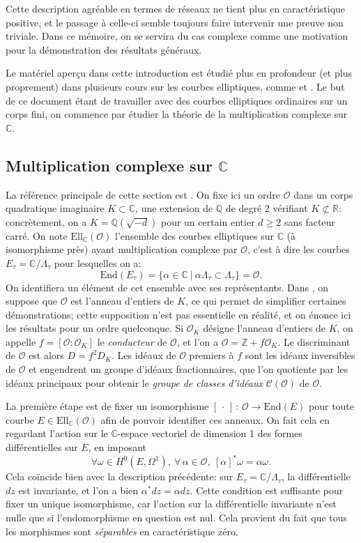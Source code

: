 \documentclass[11pt,a4paper]{article}
\newcommand{\Z}{\mathbb{Z}}
\newcommand{\C}{\mathbb{C}}
\newcommand{\Q}{\mathbb{Q}}
\newcommand{\R}{\mathbb{R}}
\renewcommand{\O}{\mathcal{O}}
\newcommand{\Cl}{\mathcal{C}}
\newcommand{\vers}{\longrightarrow}
\newcommand{\End}{\mathrm{End}}
\newcommand{\Ell}{\mathrm{Ell}}
\newcommand{\de}{\,:\,}
\renewcommand{\v}{\vspace{5mm}}
\theoremstyle{definition}
\begin{document}
Cette description agréable en termes de réseaux ne tient plus en caractéristique positive, et le passage à celle-ci semble toujours faire intervenir une preuve non triviale. Dans ce mémoire, on se servira du cas complexe comme une motivation pour la démonstration des résultats généraux.

\v

Le matériel aperçu dans cette introduction est étudié plus en profondeur (et plus proprement) dans plusieurs cours sur les courbes elliptiques, comme \cite{Nekovar} et \cite{Stroh}.
Le but de ce document étant de travailler avec des courbes elliptiques ordinaires sur un corps fini, on commence par étudier la théorie de la multiplication complexe sur $\C$.


\subsection{Multiplication complexe sur $\C$}


La référence principale de cette section est \cite{Sil2}. On fixe ici un ordre $\O$ dans un corps quadratique imaginaire $K\subset \C$, une extension de $\Q$ de degré 2 vérifiant $K \not\subset\R$: concrètement, on a $K=\Q(\sqrt{-d})$ pour un certain entier $d\geq 2$ sans facteur carré. On note $\Ell_\C(\O)$ l'ensemble des courbes elliptiques sur $\C$ (à isomorphisme près) ayant multiplication complexe par $\O$, c'est à dire les courbes $E_\tau = \C/\Lambda_\tau$ pour lesquelles on a:
$$\End(E_\tau) = \{\alpha\in \C\ |\ \alpha\Lambda_\tau \subset \Lambda_\tau\} = \O.$$
On identifiera un élément de cet ensemble avec ses représentants. Dans \cite{Sil2}, on suppose que $\O$ est l'anneau d'entiers de $K$, ce qui permet de simplifier certaines démonstrations; cette supposition n'est pas essentielle en réalité, et on énonce ici les résultats pour un ordre quelconque. %
Si $\O_K$ désigne l'anneau d'entiers de $K$, on appelle $f=[\O:\O_K]$ le \emph{conducteur} de $\O$, et l'on a $\O = \Z  + f \O_K$. Le discriminant de $\O$ est alors $D = f^2 D_K$. Les idéaux de $\O$ premiers à $f$ sont les idéaux inversibles de $\O$ et engendrent un groupe d'idéaux fractionnaires, que l'on quotiente par les idéaux principaux pour obtenir le \emph{groupe de classes d'idéaux} $\Cl(\O)$ de $\O$.
\v

La première étape est de fixer un isomorphisme $[\,\cdot\,]\de \O\vers \End(E)$ pour toute courbe $E\in \Ell_\C(\O)$ afin de pouvoir identifier ces anneaux. On fait cela en regardant l'action sur le $\C$-espace vectoriel de dimension 1 des formes différentielles sur $E$, en imposant
$$\forall \omega\in H^0(E,\Omega^1),\ \forall\,\alpha\in\O,\ [\alpha]^*\omega = \alpha \omega.$$
Cela coïncide bien avec la description précédente: sur $E_\tau = \C/\Lambda_\tau$, la différentielle $dz$ est invariante, et l'on a bien $\alpha^* dz = \alpha dz$. Cette condition est suffisante pour fixer un unique isomorphisme, car l'action sur la différentielle invariante n'est nulle que si l'endomorphisme en question est nul. Cela provient du fait que tous les morphismes sont \emph{séparables} en caractéristique zéro.
\end{document}
